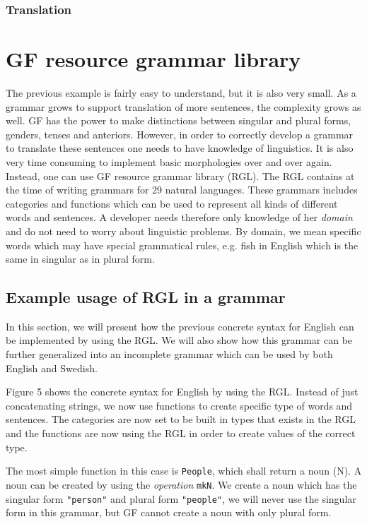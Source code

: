 \subsubsection*{Translation}

\section{GF resource grammar library}

The previous example is fairly easy to understand, but it is also very small. As a grammar grows to support translation of more sentences, the complexity grows as well. GF has the power to make distinctions between singular and plural forms, genders, tenses and anteriors. However, in order to correctly develop a grammar to translate these sentences one needs to have knowledge of linguistics. It is also very time consuming to implement basic morphologies over and over again. Instead, one can use GF resource grammar library (RGL). The RGL contains at the time of writing grammars for 29 natural languages. These grammars includes categories and functions which can be used to represent all kinds of different words and sentences. A developer needs therefore only knowledge of her \emph{domain} and do not need to worry about linguistic problems. By domain, we mean specific words which may have special grammatical rules, e.g. fish in English which is the same in singular as in plural form.

\subsection{Example usage of RGL in a grammar}

In this section, we will present how the previous concrete syntax for English can be implemented by using the RGL. We will also show how this grammar can be further generalized into an incomplete grammar which can be used by both English and Swedish.

Figure 5 shows the concrete syntax for English by using the RGL. Instead of just concatenating strings, we now use functions to create specific type of words and sentences. The categories are now set to be built in types that exists in the RGL and the functions are now using the RGL in order to create values of the correct type.

The most simple function in this case is \texttt{People}, which shall return a noun (N). A noun can be created by using the \emph{operation} \texttt{mkN}. We create a noun which has the singular form \texttt{"person"} and plural form \texttt{"people"}, we will never use the singular form in this grammar, but GF cannot create a noun with only plural form. 

